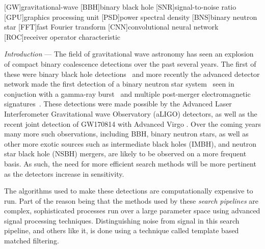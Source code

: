 \documentclass[%
showpacs,
 amsmath,amssymb,
 aps,
 twocolumn,
 prl,
 reprint,
floatfix,
]{revtex4-1}
\begin{document}
\maketitle

[GW]{gravitational-wave}
[BBH]{binary black hole}
[SNR]{signal-to-noise ratio}
[GPU]{graphics processing unit}
[PSD]{power spectral density}
[BNS]{binary neutron star}
[FFT]{fast Fourier transform}
[CNN]{convolutional neural network}
[ROC]{receiver operator characteristic}


%
%

%
%
\textit{Introduction} --- 
%
%
The field of gravitational wave astronomy has seen an explosion of compact
binary coalescence detections over the past several years. The first of these
were binary black hole detections~\cite{PhysRevLett.116.061102,
PhysRevLett.116.241103, PhysRevLett.118.221101} and more recently the advanced
detector network made the first detection of a binary neutron star
system~\cite{PhysRevLett.119.161101} seen in conjuction with a gamma-ray
burst~\cite{2017arXiv171005834L,2017arXiv171005446G,2017arXiv171005449S} and
multiple post-merger electromagnetic signatures~\cite{2017arXiv171005833L}.
These detections were made possible by the Advanced Laser Interferometer
Gravitational wave Observatory (aLIGO) detectors, as well as the recent joint
detection of GW170814 with Advanced Virgo \cite{PhysRevLett.119.141101}. Over
the coming years many more such observations, including \ac{BBH}, binary
neutron stars, as well as other more exotic sources such as intermediate black
holes (IMBH), and neutron star black hole (NSBH) mergers, are likely to be
observed on a more frequent basis. As such, the need for more efficient search
methods will be more pertinent as the detectors increase in sensitivity.

%
%
The algorithms used to make these detections \cite{0264-9381-33-21-215004, 0004-637X-748-2-136} are computationally expensive to run.
Part of the reason being that the methods used by these \textit{search
pipelines} are complex, sophisticated processes run over a large parameter
space using advanced signal processing techniques. Distinguishing noise from
signal in this search pipeline, and others like it, is done using a technique
called template based matched filtering. 
\end{document}
